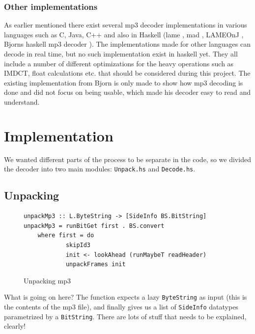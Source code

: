 \documentclass[a4paper,12pt]{article}
\begin{document}
       \subsubsection{Other implementations}
           As earlier mentioned there exist several mp3 decoder
           implementations in various languages such as C, Java, C++
           and also in Haskell (lame \cite{lame}, mad \cite{mad},
           LAMEOnJ \cite{lameonj}, Bjorns haskell mp3
           decoder \cite{bjorn}). The implementations made for other languages can
           decode in real time, but no such implementation exist in
           haskell yet. They all include a number of different
           optimizations for the heavy operations such as IMDCT,
           float calculations etc. that should be considered during
           this project. The existing implementation from Bjorn is
           only made to show how mp3 decoding is done and did not
           focus on being usable, which made his decoder easy to read
           and understand.

\section{Implementation}
    We wanted different parts of the process to be separate in the code, so we
    divided the decoder into two main modules: \texttt{Unpack.hs} and
    \texttt{Decode.hs}.

    \subsection{Unpacking}
\begin{figure}[h]
  \begin{center}
    \begin{lstlisting}
unpackMp3 :: L.ByteString -> [SideInfo BS.BitString]
unpackMp3 = runBitGet first . BS.convert
    where first = do
            skipId3
            init <- lookAhead (runMaybeT readHeader)
            unpackFrames init
    \end{lstlisting}
    \caption{Unpacking mp3}\label{fig:unpacking_mp3}
  \end{center}
\end{figure}

    What is going on here? The function expects a lazy \texttt{ByteString} as
    input (this is the contents of the mp3 file), and finally gives us a list of
    \texttt{SideInfo} datatypes parametrized by a \texttt{BitString}. There are
    lots of stuff that needs to be explained, clearly!
\end{document}
